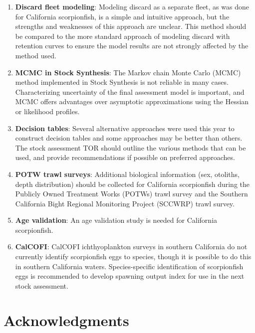 \documentclass[12pt,]{article}
\begin{document}
\begin{enumerate}
\item \textbf{Discard fleet modeling}: Modeling discard as a separate fleet, as 
was done for California scorpionfish, is a simple and intuitive approach, but 
the strengths and weaknesses of this approach are unclear. This method should 
be compared to the more standard approach of modeling discard with retention 
curves to ensure the model results are not strongly affected by the method used.


\item \textbf{MCMC in Stock Synthesis}: The Markov chain Monte Carlo (MCMC) 
method implemented in Stock Synthesis is not reliable in many cases.  
Characterizing uncertainty of the final assessment model is important, and 
MCMC offers advantages over asymptotic approximations using the Hessian or 
likelihood profiles. 

\item \textbf{Decision tables}: Several alternative approaches were used this 
year to construct decision tables and some approaches may be better than others. 
The stock assessment TOR should outline the various methods that can be used, 
and provide recommendations if possible on preferred approaches.


\item \textbf{POTW trawl surveys}: Additional biological information 
(sex, otoliths, depth distribution) should be collected for California 
scorpionfish during the Publicly Owned Treatment Works (POTWs) trawl 
survey and the Southern California Bight Regional Monitoring Project 
(SCCWRP) trawl survey.

\item \textbf{Age validation}: An age validation study is needed for 
California scorpionfish.


\item \textbf{CalCOFI}: CalCOFI ichthyoplankton surveys in southern California 
do not currently identify scorpionfish eggs to species, though it is possible to 
do this in southern California waters. Species-specific identification of 
scorpionfish eggs is recommended to develop spawning output index for use in 
the next stock assessment.



\end{enumerate}

\section{Acknowledgments}\label{acknowledgments}
\end{document}
